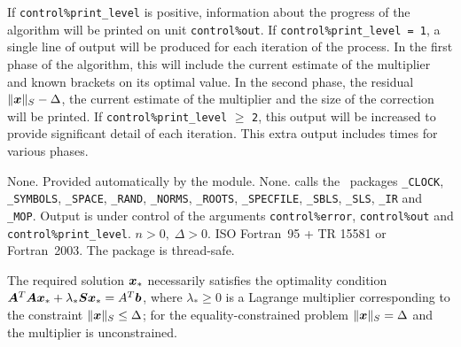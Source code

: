\documentclass{galahad}
\newcommand{\packagename}{LLST}
\begin{document}

\galinfo
If {\tt control\%print\_level} is positive, information about the progress
of the algorithm will be printed on unit {\tt control\-\%\-out}.
If {\tt control\%print\_level = 1}, a single line of output will be produced
for each iteration of the process. In the first phase of the algorithm,
this will include the current estimate of the multiplier and known
brackets on its optimal value. In the second phase, the residual
$\|{\bm{x}}\|_S - \Delta$, the current estimate of the multiplier and
the size of the correction will be printed.
If {\tt control\%print\_level} $\geq$ {\tt 2}, this
output will be increased to provide significant detail of each iteration.
This extra output includes times for various phases.


\galgeneral

\galcommon None.
\galworkspace Provided automatically by the module.
\galroutines None.
\galmodules {\tt \packagename\_solve} calls the \galahad\ packages
{\tt \libraryname\_CLOCK},
{\tt \libraryname\_SY\-M\-BOLS},
{\tt \libraryname\_\-SPACE},
{\tt \libraryname\-\_\-RAND},
{\tt \libraryname\_\-NORMS},
{\tt \libraryname\_\-ROOTS},
{\tt \libraryname\_SPECFILE},
{\tt \libraryname\_SBLS},
{\tt \libraryname\_SLS},
{\tt \libraryname\_IR}
and
{\tt \libraryname\_MOP}.
\galio Output is under control of the arguments
{\tt control\%error}, {\tt control\%out} and {\tt control\%print\_level}.
\galrestrictions $n  >  0, \;  \Delta  >  0$.
\galportability ISO Fortran~95 + TR 15581 or Fortran~2003.
The package is thread-safe.


\galmethod
The required solution ${\bm{x}}_*$ necessarily satisfies the optimality condition
${\bm{A}}^T {\bm{A}} {\bm{x}}_* + \lambda_* {\bm{S}} {\bm{x}}_* = A^T {\bm{b}}$,
where $\lambda_* \geq 0$ is a Lagrange
multiplier corresponding to the constraint $\|{\bm{x}}\|_S  \leq  \Delta$;
for the equality-constrained problem $\|{\bm{x}}\|_S = \Delta$ and
the multiplier is unconstrained.
\end{document}
